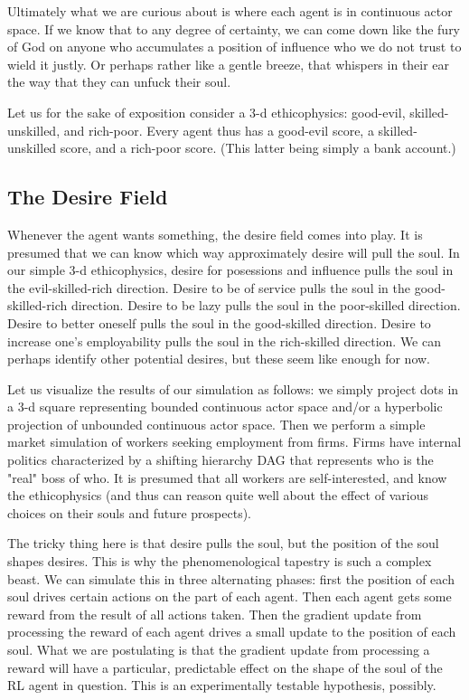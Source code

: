 \documentclass{article}
\begin{document}
Ultimately what we are curious about is where each agent is in
continuous actor space. If we know that to any degree of certainty, we
can come down like the fury of God on anyone who accumulates a
position of influence who we do not trust to wield it justly. Or
perhaps rather like a gentle breeze, that whispers in their ear the
way that they can unfuck their soul.

Let us for the sake of exposition consider a 3-d ethicophysics:
good-evil, skilled-unskilled, and rich-poor. Every agent thus has a
good-evil score, a skilled-unskilled score, and a rich-poor
score. (This latter being simply a bank account.)

\subsection{The Desire Field}

Whenever the agent wants something, the desire field comes into
play. It is presumed that we can know which way approximately desire
will pull the soul. In our simple 3-d ethicophysics, desire for
posessions and influence pulls the soul in the evil-skilled-rich
direction. Desire to be of service pulls the soul in the
good-skilled-rich direction. Desire to be lazy pulls the soul in the
poor-skilled direction.  Desire to better oneself pulls the soul in
the good-skilled direction. Desire to increase one's employability
pulls the soul in the rich-skilled direction. We can perhaps identify
other potential desires, but these seem like enough for now.

Let us visualize the results of our simulation as follows: we simply
project dots in a 3-d square representing bounded continuous actor
space and/or a hyperbolic projection of unbounded continuous actor
space. Then we perform a simple market simulation of workers seeking
employment from firms. Firms have internal politics characterized by a
shifting hierarchy DAG that represents who is the "real" boss of
who. It is presumed that all workers are self-interested, and know the
ethicophysics (and thus can reason quite well about the effect of
various choices on their souls and future prospects).

The tricky thing here is that desire pulls the soul, but the position
of the soul shapes desires. This is why the phenomenological tapestry
is such a complex beast. We can simulate this in three alternating
phases: first the position of each soul drives certain actions on the
part of each agent. Then each agent gets some reward from the result
of all actions taken. Then the gradient update from processing the
reward of each agent drives a small update to the position of each
soul. What we are postulating is that the gradient update from
processing a reward will have a particular, predictable effect on the
shape of the soul of the RL agent in question. This is an
experimentally testable hypothesis, possibly.
\end{document}
